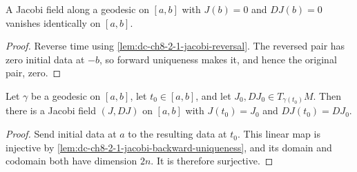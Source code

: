 \begin{lemma}
  \label{lem:dc-ch8-2-1-jacobi-backward-uniqueness}
  \leanok
  A Jacobi field along a geodesic on $[a,b]$ with $J(b)=0$ and $DJ(b)=0$ vanishes identically
  on $[a,b]$.
\end{lemma}
\begin{proof}
  \leanok
\sketch
  Reverse time using \cref{lem:dc-ch8-2-1-jacobi-reversal}. The reversed pair has zero
  initial data at $-b$, so forward uniqueness makes it, and hence the original pair, zero.
\end{proof}

\begin{lemma}
  \label{lem:dc-ch8-2-1-jacobi-interior-data}
  \leanok
  Let $\gamma$ be a geodesic on $[a,b]$, let $t_0\in[a,b]$, and let $J_0,DJ_0\in
  T_{\gamma(t_0)}M$. Then there is a Jacobi field $(J,DJ)$ on $[a,b]$ with
  $J(t_0)=J_0$ and $DJ(t_0)=DJ_0$.
\end{lemma}
\begin{proof}
  \leanok
\sketch
  Send initial data at $a$ to the resulting data at $t_0$. This linear map is injective by
  \cref{lem:dc-ch8-2-1-jacobi-backward-uniqueness}, and its domain and codomain both have
  dimension $2n$. It is therefore surjective.
\end{proof}

